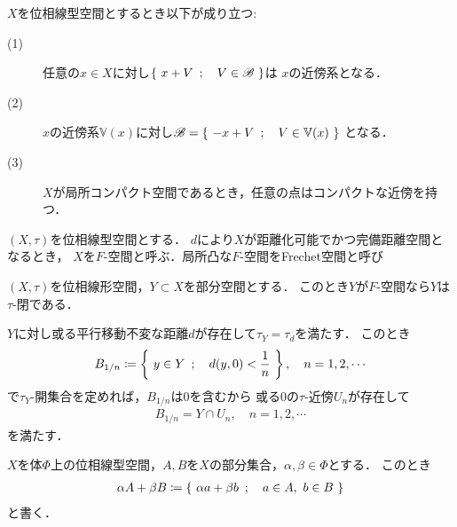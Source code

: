 	\begin{screen}
		\begin{thm}[局所基は平行移動により任意の点の近傍系となる]
			$X$を位相線型空間とするとき以下が成り立つ:
			\begin{description}
				\item[(1)] 任意の$x \in X$に対し$\left\{\ x + V\ \, ; \quad V \in \mathscr{B}\ \right\}$は
					$x$の近傍系となる．
				\item[(2)] $x$の近傍系$\mathbb{V}(x)$に対し$\mathscr{B} = \left\{\ -x + V\ \, ; \quad V \in \mathbb{V}(x)\ \right\}$
					となる．
				\item[(3)] $X$が局所コンパクト空間であるとき，任意の点はコンパクトな近傍を持つ． 
 			\end{description}
		\end{thm}
	\end{screen}
	
	\begin{screen}
		\begin{dfn}
			$(X,\tau)$を位相線型空間とする．
			$d$により$X$が距離化可能でかつ完備距離空間となるとき，
			$X$を$F$-空間と呼ぶ．局所凸な$F$-空間をFrechet空間と呼び
		\end{dfn}
	\end{screen}
	
	\begin{screen}
		\begin{thm}
			$(X,\tau)$を位相線形空間，$Y \subset X$を部分空間とする．
			このとき$Y$が$F$-空間なら$Y$は$\tau$-閉である．
		\end{thm}
	\end{screen}
	
	\begin{prf}
		$Y$に対し或る平行移動不変な距離$d$が存在して$\tau_Y = \tau_d$を満たす．
		このとき
		\begin{align}
			B_{1/n} \coloneqq \left\{\ y \in Y\ \, ; \quad d(y,0) < \frac{1}{n}\ \right\},
			\quad n=1,2,\cdots
		\end{align}
		で$\tau_Y$-開集合を定めれば，$B_{1/n}$は$0$を含むから
		或る0の$\tau$-近傍$U_n$が存在して
		\begin{align}
			B_{1/n} = Y \cap U_n, \quad n=1,2,\cdots
		\end{align}
		を満たす．
	\end{prf}
	
	\begin{screen}
		\begin{dfn}[集合の線型演算]
			$X$を体$\Phi$上の位相線型空間，$A,B$を$X$の部分集合，$\alpha,\beta \in \Phi$とする．
			このとき
			\begin{align}
				\alpha A + \beta B \coloneqq \left\{\ \alpha a + \beta b\ \, ; \quad a \in A,\ b \in B\ \right\}
			\end{align}
			と書く．
		\end{dfn}
	\end{screen}
	
